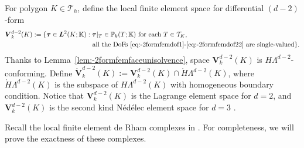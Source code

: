 \documentclass[10pt]{amsart}
\numberwithin{equation}{section}
\begin{document}
For polygon $K\in \mathcal T_h$, define the local finite element space for differential $(d-2)$-form  
\begin{align*}  
\boldsymbol{V}_{k}^{d-2}(K):=\{\boldsymbol{\tau}\in\boldsymbol{L}^2(K;\mathbb K)&: \boldsymbol{\tau}|_{T}\in \mathbb P_{k}(T;\mathbb K) \textrm{ for each } T\in\mathcal T_K, \\
&\;\;\textrm{ all the DoFs \eqref{eq:-2formfemdof1}-\eqref{eq:-2formfemdof22} are single-valued}\}.
\end{align*}
Thanks to Lemma~\ref{lem:-2formfemfaceunisolvence}, space $\boldsymbol{V}_{k}^{d-2}(K)$ is $H\Lambda^{d-2}$-conforming.
Define $\mathring{\boldsymbol{V}}_{k}^{d-2}(K):=\boldsymbol{V}_{k}^{d-2}(K)\cap \mathring{H}\Lambda^{d-2}(K)$, where $\mathring{H}\Lambda^{d-2}(K)$ is the subspace of $H\Lambda^{d-2}(K)$ with homogeneous boundary condition.
Notice that
 $\boldsymbol{V}_{k}^{d-2}(K)$ is the Lagrange element space for $d=2$,
and $\boldsymbol{V}_{k}^{d-2}(K)$ is the second kind N\'ed\'elec element space for $d=3$ \cite{Nedelec:1986family}. 

Recall the local finite element de Rham complexes in \cite{ArnoldFalkWinther2006,Arnold2018}.
For completeness, we will prove the exactness of these complexes.
\end{document}
